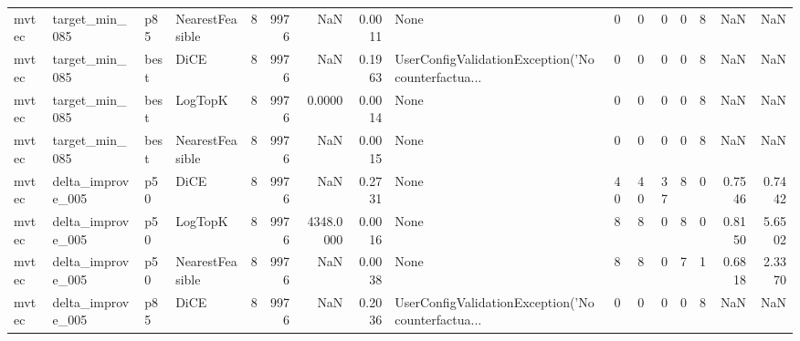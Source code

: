 \begin{tabular}{llllrrrrlrrrrrrr}
  mvtec &       target\_min\_085 &    p85 & NearestFeasible &            8 &                 9976 &                      NaN &      0.0011 &                                               None &      0 &            0 &        0 &              0 &          8 &                NaN &            NaN \\
  mvtec &       target\_min\_085 &   best &            DiCE &            8 &                 9976 &                      NaN &      0.1963 & UserConfigValidationException('No counterfactua... &      0 &            0 &        0 &              0 &          8 &                NaN &            NaN \\
  mvtec &       target\_min\_085 &   best &         LogTopK &            8 &                 9976 &                   0.0000 &      0.0014 &                                               None &      0 &            0 &        0 &              0 &          8 &                NaN &            NaN \\
  mvtec &       target\_min\_085 &   best & NearestFeasible &            8 &                 9976 &                      NaN &      0.0015 &                                               None &      0 &            0 &        0 &              0 &          8 &                NaN &            NaN \\
  mvtec &    delta\_improve\_005 &    p50 &            DiCE &            8 &                 9976 &                      NaN &      0.2731 &                                               None &     40 &           40 &       37 &              8 &          0 &             0.7546 &         0.7442 \\
  mvtec &    delta\_improve\_005 &    p50 &         LogTopK &            8 &                 9976 &                4348.0000 &      0.0016 &                                               None &      8 &            8 &        0 &              8 &          0 &             0.8150 &         5.6502 \\
  mvtec &    delta\_improve\_005 &    p50 & NearestFeasible &            8 &                 9976 &                      NaN &      0.0038 &                                               None &      8 &            8 &        0 &              7 &          1 &             0.6818 &         2.3370 \\
  mvtec &    delta\_improve\_005 &    p85 &            DiCE &            8 &                 9976 &                      NaN &      0.2036 & UserConfigValidationException('No counterfactua... &      0 &            0 &        0 &              0 &          8 &                NaN &            NaN \\

\end{tabular}

